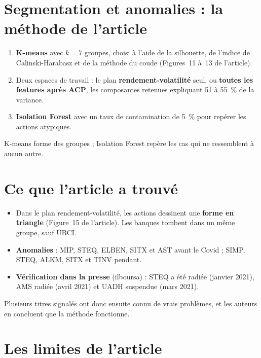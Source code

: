 \documentclass[11pt,a4paper]{article}
\newcommand{\pc}{~\%}
\begin{document}
\section{Segmentation et anomalies : la méthode de l'article}\label{sec:art-methode}
\begin{enumerate}
  \item \textbf{K-means} avec $k = 7$ groupes, choisi à l'aide de la silhouette, de l'indice de Calinski-Harabasz et de la méthode du coude (Figures~11 à~13 de l'article).
  \item Deux espaces de travail : le plan \textbf{rendement-volatilité} seul, ou \textbf{toutes les features après ACP}, les composantes retenues expliquant 51 à 55\pc{} de la variance.
  \item \textbf{Isolation Forest} avec un taux de contamination de 5\pc{} pour repérer les actions atypiques.
\end{enumerate}
K-means forme des groupes ; Isolation Forest repère les cas qui ne ressemblent à aucun autre.

\section{Ce que l'article a trouvé}\label{sec:art-resultats}
\begin{itemize}
  \item Dans le plan rendement-volatilité, les actions dessinent une \textbf{forme en triangle} (Figure~15 de l'article). Les banques tombent dans un même groupe, sauf UBCI.
  \item \textbf{Anomalies} : MIP, STEQ, ELBEN, SITX et AST avant le Covid ; SIMP, STEQ, ALKM, SITX et TINV pendant.
  \item \textbf{Vérification dans la presse} (ilboursa) : STEQ a été radiée (janvier 2021), AMS radiée (avril 2021) et UADH suspendue (mars 2021).
\end{itemize}
Plusieurs titres signalés ont donc ensuite connu de vrais problèmes, et les auteurs en concluent que la méthode fonctionne.

\section{Les limites de l'article}\label{sec:art-limites}
\end{document}
